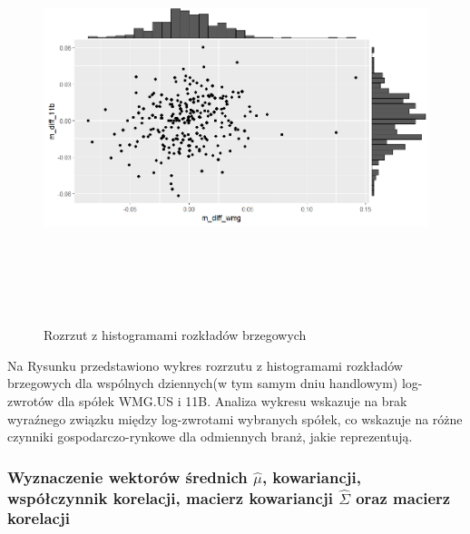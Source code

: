\documentclass[a4paper,11pt]{article}
\begin{document}
\begin{figure}[h]
\centering
\includegraphics[width=12cm, height=12cm]{img/Rozrzut_z_histogramami.png}
\caption{Rozrzut z histogramami rozkładów brzegowych}
\end{figure}

Na Rysunku przedstawiono wykres rozrzutu z histogramami rozkładów brzegowych dla wspólnych dziennych(w tym samym dniu handlowym) log-zwrotów dla spółek WMG.US i 11B. Analiza wykresu wskazuje na brak wyraźnego związku między log-zwrotami wybranych spółek, co wskazuje na różne czynniki gospodarczo-rynkowe dla odmiennych branż, jakie reprezentują.

\newpage
\subsubsection{Wyznaczenie wektorów średnich \(\hat{\mu}\), kowariancji, współczynnik korelacji, macierz kowariancji \(\hat{\Sigma}\) oraz macierz korelacji}
\end{document}
